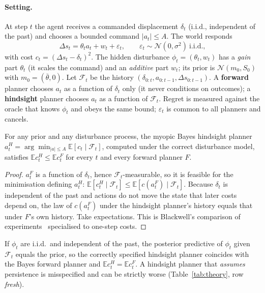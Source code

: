 
\paragraph{Setting.} At step $t$ the agent receives a commanded displacement $\delta_t$ (i.i.d., independent of
the past) and chooses a bounded command $|a_t|\le A$. The world responds
\begin{equation}
\Delta s_t=\theta_t a_t+w_t+\varepsilon_t,\qquad \varepsilon_t\sim\mathcal N(0,\sigma^2)\ \text{i.i.d.},
\end{equation}
with cost $c_t=(\Delta s_t-\delta_t)^2$. The hidden disturbance $\phi_t=(\theta_t,w_t)$ has a \emph{gain} part
$\theta_t$ (it scales the command) and an \emph{additive} part $w_t$; its prior is $\mathcal N(m_0,S_0)$ with
$m_0=(\bar\theta,0)$. Let $\mathcal F_t$ be the history $(\delta_{0:t},a_{0:t-1},\Delta s_{0:t-1})$.
A \textbf{forward} planner chooses $a_t$ as a function of $\delta_t$ only (it never conditions on outcomes);
a \textbf{hindsight} planner chooses $a_t$ as a function of $\mathcal F_t$. Regret is measured against the
oracle that knows $\phi_t$ and obeys the same bound; $\varepsilon_t$ is common to all planners and cancels.

\begin{theorem}[Dominance]\label{thm:dominance}
For any prior and any disturbance process, the myopic Bayes hindsight planner
$a^H_t=\arg\min_{|a|\le A}\mathbb E[c_t\mid\mathcal F_t]$, computed under the correct disturbance model,
satisfies $\mathbb E c^H_t\le\mathbb E c^F_t$ for every $t$ and every forward planner $F$.
\end{theorem}
\begin{proof}
$a^F_t$ is a function of $\delta_t$, hence $\mathcal F_t$-measurable, so it is feasible for the minimisation defining
$a^H_t$: $\mathbb E[c^H_t\mid\mathcal F_t]\le\mathbb E[c(a^F_t)\mid\mathcal F_t]$. Because $\delta_t$ is
independent of the past and actions do not move the state that later costs depend on, the law of $c(a^F_t)$
under the hindsight planner's history equals that under $F$'s own history. Take expectations.
This is Blackwell's comparison of experiments~\citep{blackwell1953} specialised to one-step costs.
\end{proof}

\begin{theorem}\label{thm:fresh}
If $\phi_t$ are i.i.d.\ and independent of the past, the posterior predictive of $\phi_t$ given $\mathcal F_t$ equals
the prior, so the correctly specified hindsight planner coincides with the Bayes forward planner and
$\mathbb E c^H_t=\mathbb E c^F_t$. A hindsight planner that \emph{assumes} persistence is misspecified and can be
strictly worse (Table~\ref{tab:theory}, row \emph{fresh}).
\end{theorem}

